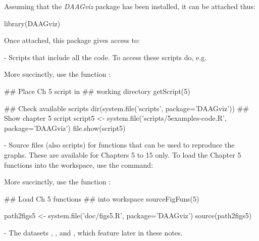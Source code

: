 Assuming that the {\em DAAGviz} package has been installed, it can be attached thus:
\begin{Schunk}
\begin{Sinput}
library(DAAGviz)
\end{Sinput}
\end{Schunk}

Once attached, this package gives access to:
\begin{itemizz}
\item[-]
Scripts that include all the code. To access these scripts do, e.g.
\begin{marginfigure}[66pt]
More succinctly, use the function :\\[-3pt]
\begin{Schunk}
\begin{Sinput}
## Place Ch 5 script in
## working directory
getScript(5)
\end{Sinput}
\end{Schunk}
\end{marginfigure}
\begin{Schunk}
\begin{Sinput}
## Check available scripts
dir(system.file('scripts', package='DAAGviz'))
## Show chapter 5 script
script5 <- system.file('scripts/5examples-code.R',
                       package='DAAGviz')
file.show(script5)
\end{Sinput}
\end{Schunk}
\item[-]
Source files (also scripts) for functions that can be used to
  reproduce the graphs. These are available for Chapters 5 to 15
only.  To load the Chapter 5 functions into the workspace,
use the command:
\begin{marginfigure}[54pt]
More succinctly, use the function :\\[-3pt]
\begin{Schunk}
\begin{Sinput}
## Load Ch 5 functions
## into workspace
sourceFigFuns(5)
\end{Sinput}
\end{Schunk}
\end{marginfigure}
\begin{Schunk}
\begin{Sinput}
path2figs5 <- system.file('doc/figs5.R',
                          package='DAAGviz')
source(path2figs5)
\end{Sinput}
\end{Schunk}
\item[-] The datasets , , and
  , which feature later in these notes.
\end{itemizz}
\newpage

